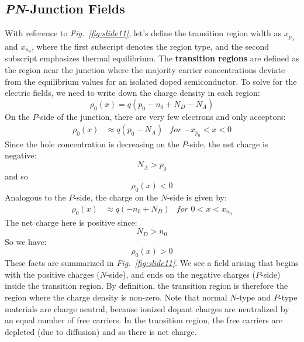 \subsection{\emph{PN}-Junction Fields}
With reference to \emph{Fig.~\ref{fig:slide11}}, let's define the transition region width as $x_{p_0}$ and $x_{n_0}$, where the first subscript denotes the region type, and the second subscript emphasizes thermal equilibrium.  The \textbf{transition regions} are defined as the region near the junction where the majority carrier concentrations deviate from the equilibrium values for an isolated doped semiconductor.  To solve for the electric fields, we need to write down the charge density in each region:
    \begin{equation} 
        \rho _0(x) = q(p_0 - n_0 + N_D - N_A) 
    \end{equation}
On the $P$-side of the junction, there are very few electrons and only acceptors:
    \begin{align} 
        \rho _0(x) &\approx q(p_0 - N_A) &\textit{for $-x_{p_0} < x < 0$} 
    \end{align}
Since the hole concentration is decreasing on the $P$-side, the net charge is negative:
    \begin{equation} 
        {N_A} > {p_0} 
    \end{equation}
and so
    \begin{equation}
        {\rho _0}(x) < 0 
    \end{equation}
Analogous to the $P$-side, the charge on the $N$-side is given by:
    \begin{align} 
        \rho _0(x) &\approx q(-n_0 + N_D) &\textit{for $0 < x < x_{n_0}$} 
    \end{align}
The net charge here is positive since:
    \begin{equation} 
        N_D > n_0 
    \end{equation}
So we have:
    \begin{equation} 
        \rho _0(x) > 0 
    \end{equation}
These facts are summarized in \emph{Fig.~\ref{fig:slide11}}.  We see a field arising that begins with the positive charges ($N$-side), and ends on the negative charges ($P$-side) inside the transition region.  By definition, the transition region is therefore the region where the charge density is non-zero.  Note that normal $N$-type and $P$-type materials are charge neutral, because ionized dopant charges are neutralized by an equal number of free carriers.  In the transition region, the free carriers are depleted (due to diffusion) and so there is net charge.   

